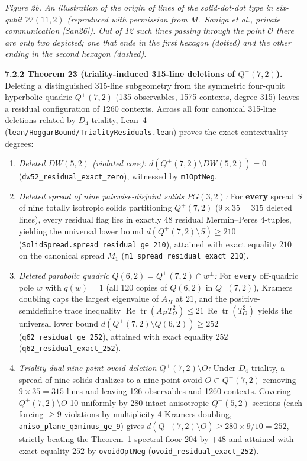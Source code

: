 \documentclass[11pt,a4paper]{article}
\providecommand{\tightlist}{\setlength{\itemsep}{0pt}\setlength{\parskip}{0pt}}
\begin{document}
\emph{Figure 2b. An illustration of the origin of lines of the solid-dot-dot type in six-qubit \(\mathcal{W}(11,2)\) (reproduced with permission from M.~Saniga et al., private communication {[}San26{]}). Out of 12 such lines passing through the point \(\mathcal{O}\) there are only two depicted; one that ends in the first hexagon (dotted) and the other ending in the second hexagon (dashed).}

\textbf{7.2.2 Theorem 23 (triality-induced 315-line deletions of \(Q^+(7,2)\)).}
Deleting a distinguished 315-line subgeometry from the symmetric four-qubit hyperbolic quadric \(Q^+(7,2)\) (135 observables, 1575 contexts, degree 315) leaves a residual configuration of 1260 contexts. Across all four canonical 315-line deletions related by \(D_4\) triality, Lean~4 (\nolinkurl{lean/HoggarBound/TrialityResiduals.lean}) proves the exact contextuality degrees:
\begin{enumerate}
\def\labelenumi{\arabic{enumi}.}
\tightlist
\item
  \emph{Deleted \(DW(5,2)\) (violated core):} \(d(Q^+(7,2) \setminus DW(5,2)) = 0\) (\nolinkurl{dw52_residual_exact_zero}), witnessed by \nolinkurl{m1OptNeg}.
\item
  \emph{Deleted spread of nine pairwise-disjoint solids \(PG(3,2)\):} For \textbf{every} spread \(S\) of nine totally isotropic solids partitioning \(Q^+(7,2)\) (\(9 \times 35 = 315\) deleted lines), every residual flag lies in exactly 48 residual Mermin--Peres 4-tuples, yielding the universal lower bound \(d(Q^+(7,2) \setminus S) \ge 210\) (\nolinkurl{SolidSpread.spread_residual_ge_210}), attained with exact equality \(210\) on the canonical spread \(M_1\) (\nolinkurl{m1_spread_residual_exact_210}).
\item
  \emph{Deleted parabolic quadric \(Q(6,2) = Q^+(7,2) \cap w^\perp\):} For \textbf{every} off-quadric pole \(w\) with \(q(w)=1\) (all 120 copies of \(Q(6,2)\) in \(Q^+(7,2)\)), Kramers doubling caps the largest eigenvalue of \(A_H\) at \(21\), and the positive-semidefinite trace inequality \(\operatorname{Re}\operatorname{tr}(A_H T_O^2) \le 21\,\operatorname{Re}\operatorname{tr}(T_O^2)\) yields the universal lower bound \(d(Q^+(7,2) \setminus Q(6,2)) \ge 252\) (\nolinkurl{q62_residual_ge_252}), attained with exact equality \(252\) (\nolinkurl{q62_residual_exact_252}).
\item
  \emph{Triality-dual nine-point ovoid deletion \(Q^+(7,2) \setminus O\):} Under \(D_4\) triality, a spread of nine solids dualizes to a nine-point ovoid \(O \subset Q^+(7,2)\) removing \(9 \times 35 = 315\) lines and leaving 126 observables and 1260 contexts. Covering \(Q^+(7,2) \setminus O\) 10-uniformly by 280 intact anisotropic \(Q^-(5,2)\) sections (each forcing \(\ge 9\) violations by multiplicity-4 Kramers doubling, \nolinkurl{aniso_plane_q5minus_ge_9}) gives \(d(Q^+(7,2) \setminus O) \ge 280 \times 9 / 10 = 252\), strictly beating the Theorem~1 spectral floor 204 by \(+48\) and attained with exact equality \(252\) by \nolinkurl{ovoidOptNeg} (\nolinkurl{ovoid_residual_exact_252}).
\end{enumerate}
\end{document}

